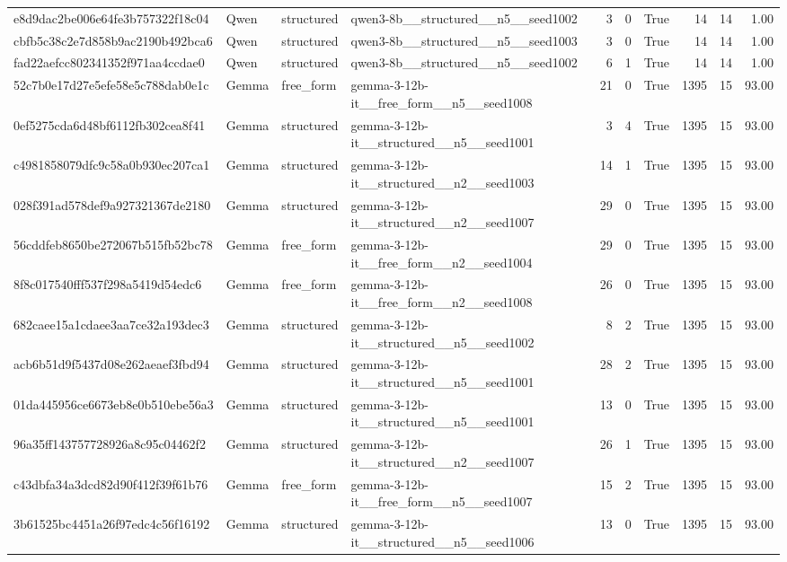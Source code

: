 \begin{longtable}{llllrrrrrr}
e8d9dac2be006e64fe3b757322f18c04 & Qwen & structured & qwen3-8b\_\_structured\_\_n5\_\_seed1002 & 3 & 0 & True & 14 & 14 & 1.00 \\
cbfb5c38c2e7d858b9ac2190b492bca6 & Qwen & structured & qwen3-8b\_\_structured\_\_n5\_\_seed1003 & 3 & 0 & True & 14 & 14 & 1.00 \\
fad22aefcc802341352f971aa4ccdae0 & Qwen & structured & qwen3-8b\_\_structured\_\_n5\_\_seed1002 & 6 & 1 & True & 14 & 14 & 1.00 \\
52c7b0e17d27e5efe58e5c788dab0e1c & Gemma & free\_form & gemma-3-12b-it\_\_free\_form\_\_n5\_\_seed1008 & 21 & 0 & True & 1395 & 15 & 93.00 \\
0ef5275cda6d48bf6112fb302cea8f41 & Gemma & structured & gemma-3-12b-it\_\_structured\_\_n5\_\_seed1001 & 3 & 4 & True & 1395 & 15 & 93.00 \\
c4981858079dfc9c58a0b930ec207ca1 & Gemma & structured & gemma-3-12b-it\_\_structured\_\_n2\_\_seed1003 & 14 & 1 & True & 1395 & 15 & 93.00 \\
028f391ad578def9a927321367de2180 & Gemma & structured & gemma-3-12b-it\_\_structured\_\_n2\_\_seed1007 & 29 & 0 & True & 1395 & 15 & 93.00 \\
56cddfeb8650be272067b515fb52bc78 & Gemma & free\_form & gemma-3-12b-it\_\_free\_form\_\_n2\_\_seed1004 & 29 & 0 & True & 1395 & 15 & 93.00 \\
8f8c017540fff537f298a5419d54edc6 & Gemma & free\_form & gemma-3-12b-it\_\_free\_form\_\_n2\_\_seed1008 & 26 & 0 & True & 1395 & 15 & 93.00 \\
682caee15a1cdaee3aa7ce32a193dec3 & Gemma & structured & gemma-3-12b-it\_\_structured\_\_n5\_\_seed1002 & 8 & 2 & True & 1395 & 15 & 93.00 \\
acb6b51d9f5437d08e262aeaef3fbd94 & Gemma & structured & gemma-3-12b-it\_\_structured\_\_n5\_\_seed1001 & 28 & 2 & True & 1395 & 15 & 93.00 \\
01da445956ce6673eb8e0b510ebe56a3 & Gemma & structured & gemma-3-12b-it\_\_structured\_\_n5\_\_seed1001 & 13 & 0 & True & 1395 & 15 & 93.00 \\
96a35ff143757728926a8c95c04462f2 & Gemma & structured & gemma-3-12b-it\_\_structured\_\_n2\_\_seed1007 & 26 & 1 & True & 1395 & 15 & 93.00 \\
c43dbfa34a3dcd82d90f412f39f61b76 & Gemma & free\_form & gemma-3-12b-it\_\_free\_form\_\_n5\_\_seed1007 & 15 & 2 & True & 1395 & 15 & 93.00 \\
3b61525bc4451a26f97edc4c56f16192 & Gemma & structured & gemma-3-12b-it\_\_structured\_\_n5\_\_seed1006 & 13 & 0 & True & 1395 & 15 & 93.00 \\

\end{longtable}
